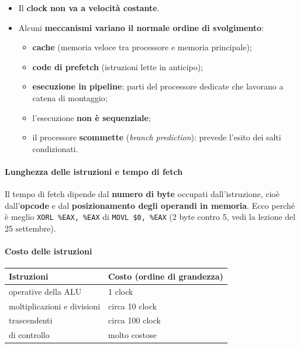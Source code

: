\documentclass[11pt,a4paper]{article}
\begin{document}
\begin{itemize}[leftmargin=*]
  \item Il \textbf{clock non va a velocità costante}.
  \item Alcuni \textbf{meccanismi variano il normale ordine di svolgimento}:
  \begin{itemize}
    \item \textbf{cache} (memoria veloce tra processore e memoria principale);
    \item \textbf{code di prefetch} (istruzioni lette in anticipo);
    \item \textbf{esecuzione in pipeline}: parti del processore dedicate che lavorano a catena di montaggio;
    \item l'esecuzione \textbf{non è sequenziale};
    \item il processore \textbf{scommette} (\emph{branch prediction}): prevede l'esito dei salti condizionati.
  \end{itemize}
\end{itemize}

\paragraph*{Lunghezza delle istruzioni e tempo di fetch}

Il tempo di fetch dipende dal \textbf{numero di byte} occupati dall'istruzione, cioè dall'\textbf{opcode} e dal \textbf{posizionamento degli operandi in memoria}. Ecco perché è meglio \texttt{XORL \%EAX, \%EAX} di \texttt{MOVL \$0, \%EAX} (2 byte contro 5, vedi la lezione del 25 settembre).

\paragraph*{Costo delle istruzioni}

\begin{center}
\begin{tabular}{l l}
\textbf{Istruzioni} & \textbf{Costo (ordine di grandezza)} \\ \hline
operative della ALU & 1 clock \\
moltiplicazioni e divisioni & circa 10 clock \\
trascendenti & circa 100 clock \\
di controllo & molto costose \\
\end{tabular}
\end{center}
\end{document}
